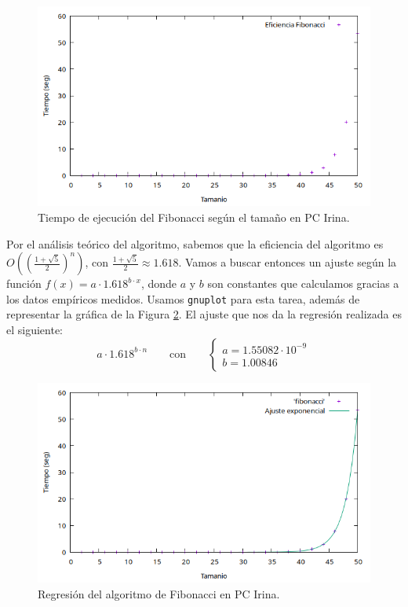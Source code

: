 \documentclass[12pt]{article}
\begin{document}
    \begin{figure}
        \centering
        \includegraphics[width=\linewidth]{images/Fibonacci/fibonacci_solopuntos.png}
        \caption{Tiempo de ejecución del Fibonacci según el tamaño en PC Irina.}
        \label{fig:fibonacci_puntos}
    \end{figure}

    Por el análisis teórico del algoritmo, sabemos que la eficiencia del algoritmo es $O\left(\left(\frac{1+\sqrt{5}}{2}\right)^n\right)$, con $\frac{1+\sqrt{5}}{2} \approx 1.618$. Vamos a buscar entonces un ajuste según la función $f(x) = a\cdot 1.618^{b\cdot x}$, donde $a$ y $b$ son constantes que calculamos gracias a los datos empíricos medidos. Usamos \verb|gnuplot| para esta tarea, además de representar la gráfica de la Figura \ref{fig:fibonacci_regresion}. El ajuste que nos da la regresión realizada es el siguiente:
    $$a \cdot 1.618^{b \cdot n} \qquad \text{con} \qquad \left\{\begin{array}{l}
         a = 1.55082 \cdot 10^{-9} \\
         b = 1.00846
    \end{array}\right.$$

    \begin{figure}
        \centering
        \includegraphics[width=\linewidth]{images/Fibonacci/fibonacci.png}
        \caption{Regresión del algoritmo de Fibonacci en PC Irina.}
        \label{fig:fibonacci_regresion}
    \end{figure}
\end{document}

